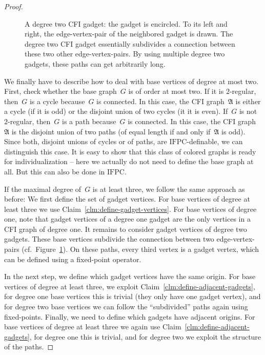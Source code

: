 \documentclass[]{lmcs}
\newcommand{\StructA}{\mathfrak{A}}
\newcommand{\IFPC}{\ensuremath{\mathrm{IFPC}}}
\begin{document}
\begin{proof}
\begin{figure}
		\caption{A degree two CFI gadget: the gadget is encircled.
		To its left and right, the edge-vertex-pair of the neighbored gadget is drawn. The degree two CFI gadget essentially subdivides a connection between these two other edge-vertex-pairs.
		By using multiple degree two gadgets, these paths can get arbitrarily long.}
		\label{fig:degree-two-gadget}
	\end{figure}
	We finally have to describe how to deal with base vertices of degree at most two.
	First, check whether the base graph~$G$ is of order at most two.
	If it is $2$-regular, then~$G$ is a cycle because~$G$ is connected.
	In this case, the CFI graph~$\StructA$ is either a cycle (if it is odd) or the disjoint union of two cycles (it it is even).
	If~$G$ is not $2$-regular, then~$G$ is a path because~$G$ is connected.
	In this case, the CFI graph~$\StructA$ is the disjoint union of two paths (of equal length if and only if~$\StructA$ is odd).
	Since both, disjoint unions of cycles or of paths, are \IFPC-definable, we can distinguish this case.
	It is easy to show that this class of colored graphs is ready for individualization -- here we actually do not need to define the base graph at all. But this can also be done in \IFPC.
	
	If the maximal degree of~$G$ is at least three, we follow the same approach as before:
	We first define the set of gadget vertices.
	For base vertices of degree at least three we use Claim~\ref{clm:define-gadget-vertices}.
	For base vertices of degree one,
	note that gadget vertices of a degree one gadget are the only vertices in a CFI graph of degree one.
	It remains to consider gadget vertices of degree two gadgets. 
	These base vertices subdivide the connection between two edge-vertex-pairs (cf.~Figure~\ref{fig:degree-two-gadget}).
	On these paths, every third vertex is a gadget vertex, which can be defined using a fixed-point operator.
	
	In the next step, we define which gadget vertices have the same origin.
	For base vertices of degree at least three,
	we exploit Claim~\ref{clm:define-adjacent-gadgets}, for degree one base vertices this is trivial (they only have one gadget vertex),
	and for degree two base vertices we can follow the ``subdivided'' paths again using fixed-points.
	Finally, we need to define which gadgets have adjacent origins.
	For base vertices of degree at least three we again use Claim~\ref{clm:define-adjacent-gadgets},
	for degree one this is trivial,
	and for degree two we exploit the structure of the paths.
	

\end{proof}
\end{document}

